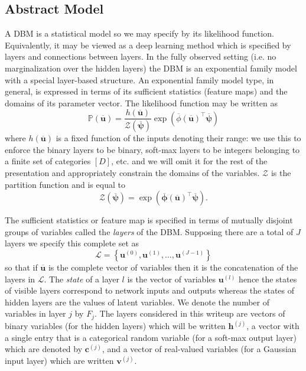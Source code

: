 \documentclass{article} %
\begin{document}
\subsection{Abstract Model}

A DBM is a statistical model so we may specify by its likelihood
function. Equivalently, it may be viewed as a deep learning method
which is specified by layers and connections between layers.  In the
fully observed setting (i.e. no marginalization over the hidden
layers) the DBM is an exponential family model with a special layer-based
structure.  An exponential family model type, in general, is expressed in
terms of its sufficient statistics (feature maps) and the domains of
its parameter vector.  The likelihood function may be written as
\begin{equation}\label{eq:exponential-likelihood-function}
\mathbb{P}(\overline{\mathbf{u}}) = \frac{h(\overline{\mathbf{u}})}{\mathcal{Z}(\overline{\boldsymbol{\psi}})}\exp( \overline{\phi}(\overline{\mathbf{u}})^\top \overline{\boldsymbol{\psi}})
\end{equation}
where $h(\overline{\mathbf{u}})$ is a fixed function of the inputs
denoting their range: we use this to enforce the binary layers to be
binary, soft-max layers to be integers belonging to a finite set of
categories $[D]$, etc. and we will omit it for the rest of the
presentation and appropriately constrain the domains of the variables.
$\mathcal{Z}$ is the partition function and is equal to
\begin{equation}
\mathcal{Z}(\overline{\boldsymbol{\psi}}) = \exp( \overline{\boldsymbol{\phi}}(\overline{\mathbf{u}})^\top \overline{\boldsymbol{\psi}}).
\end{equation}

The sufficient statistics or feature map is specified in terms of
mutually disjoint groups of variables called the {\it layers} of the
DBM. Supposing there are a total of $J$ layers we specify this complete set as
\begin{equation}
\mathcal{L}=\left\{\mathbf{u}^{(0)},\mathbf{u}^{(1)},\ldots,\mathbf{u}^{(J-1)}\right\}
\end{equation}
so that if $\overline{\mathbf{u}}$ is the complete vector of variables then it is the concatenation
of the layers in $\mathcal{L}$.  The {\it state} of a layer $l$ is the vector of variables
$\mathbf{u}^{(l)}$ hence the states of visible layers correspond to network inputs and outputs whereas
the states of hidden layers are the values of latent variables.  We denote the number of variables in layer $j$ by 
$F_j$. The layers considered in this writeup
are vectors of binary variables (for the hidden layers) which will be written $\mathbf{h}^{(j)}$, 
a vector with a single entry that is a categorical random variable (for a soft-max output layer) which are denoted by $\mathbf{c}^{(j)}$,
and a vector of real-valued variables (for a Gaussian input layer) which are written $\mathbf{v}^{(j)}$.
\end{document}
